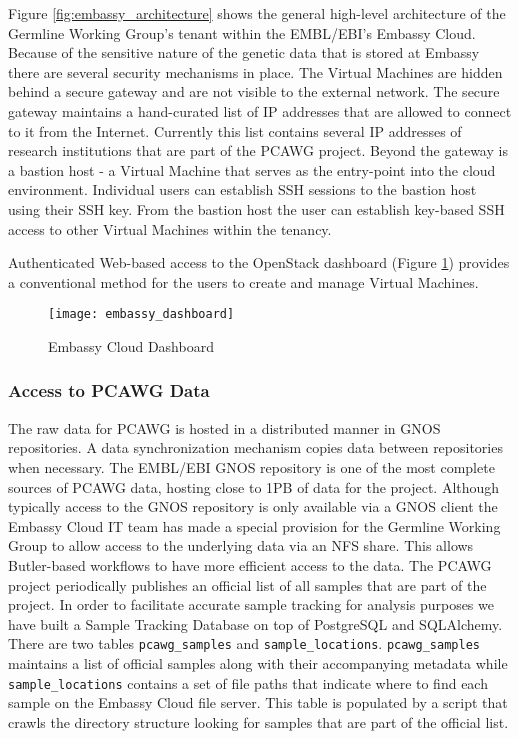 Figure \ref{fig:embassy_architecture} shows the general high-level architecture of the Germline Working Group's tenant within the EMBL/EBI's Embassy Cloud. Because of the sensitive nature of the genetic data that is stored at Embassy there are several security mechanisms in place. The Virtual Machines are hidden behind a secure gateway and are not visible to the external network. The secure gateway maintains a hand-curated list of IP addresses that are allowed to connect to it from the Internet. Currently this list contains several IP addresses of research institutions that are part of the PCAWG project. Beyond the gateway is a bastion host - a Virtual Machine that serves as the entry-point into the cloud environment. Individual users can establish SSH sessions to the bastion host using their SSH key. From the bastion host the user can establish key-based SSH access to other Virtual Machines within the tenancy. 

Authenticated Web-based access to the OpenStack dashboard (Figure \ref{fig:embassy_dashboard}) provides a conventional method for the users to create and manage Virtual Machines.

\begin{figure}[h!]
\texttt{[image: embassy\_dashboard]}
\centering
\caption {Embassy Cloud Dashboard}
\label{fig:embassy_dashboard}
\end{figure}

\subsubsection{Access to PCAWG Data}
\label{sec:pcawg_data_access}

The raw data for PCAWG is hosted in a distributed manner in GNOS repositories. A data synchronization mechanism copies data between repositories when necessary. The EMBL/EBI GNOS repository is one of the most complete sources of PCAWG data, hosting close to 1PB of data for the project. Although typically access to the GNOS repository is only available via a GNOS client the Embassy Cloud IT team has made a special provision for the Germline Working Group to allow access to the underlying data via an NFS share. This allows Butler-based workflows to have more efficient access to the data.
\newpage
The PCAWG project periodically publishes an official list of all samples that are part of the project. In order to facilitate accurate sample tracking for analysis purposes we have built a Sample Tracking Database on top of PostgreSQL and SQLAlchemy. There are two tables \texttt{pcawg_samples} and \texttt{sample_locations}. \texttt{pcawg_samples} maintains a list of official samples along with their accompanying metadata while \texttt{sample_locations} contains a set of file paths that indicate where to find each sample on the Embassy Cloud file server. This table is populated by a script that crawls the directory structure looking for samples that are part of the official list.

